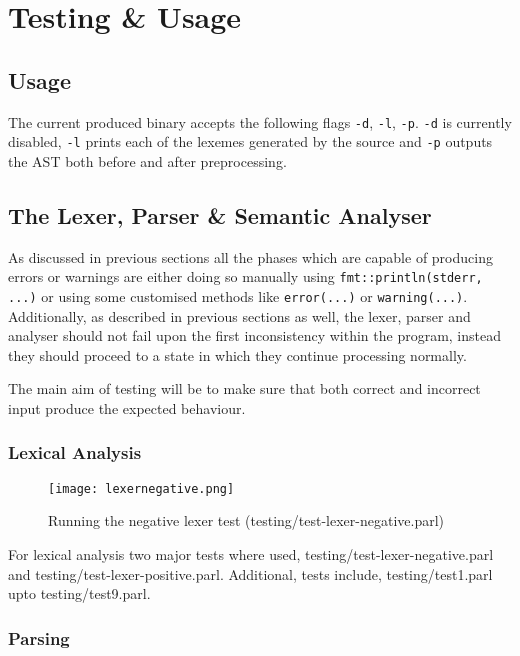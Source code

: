 \section{Testing \& Usage}

\subsection{Usage}

The current produced binary accepts the following flags
\texttt{-d}, \texttt{-l}, \texttt{-p}. \texttt{-d} is currently
disabled, \texttt{-l} prints each of the lexemes generated by
the source and \texttt{-p} outputs the AST both before and after
preprocessing.

\subsection{The Lexer, Parser \& Semantic Analyser}

As discussed in previous sections all the phases which are
capable of producing errors or warnings are either doing so
manually using \texttt{fmt::println(stderr, ...)} or using some
customised methods like \texttt{error(...)} or
\texttt{warning(...)}. Additionally, as described in previous
sections as well, the lexer, parser and analyser should not fail
upon the first inconsistency within the program, instead they
should proceed to a state in which they continue processing
normally.

The main aim of testing will be to make sure that both correct
and incorrect input produce the expected behaviour.

\subsubsection{Lexical Analysis}

\begin{figure}[H]
\centering
\texttt{[image: lexernegative.png]}
\caption{Running the negative lexer test
(testing/test-lexer-negative.parl)}
\end{figure}

For lexical analysis two major tests where used,
testing/test-lexer-negative.parl and
testing/test-lexer-positive.parl. Additional, tests include,
testing/test1.parl upto testing/test9.parl.

\subsubsection{Parsing}

